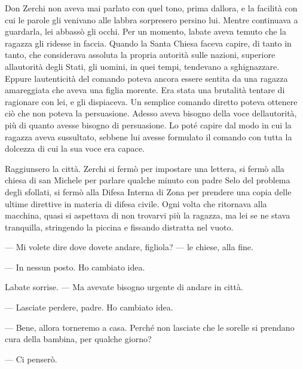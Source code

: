 Don Zerchi non aveva mai parlato con quel tono, prima
d\textquotesingle allora, e la facilità con cui le parole gli venivano
alle labbra sorpresero persino lui. Mentre continuava a guardarla, lei
abbassò gli occhi. Per un momento, l\textquotesingle abate aveva temuto
che la ragazza gli ridesse in faccia. Quando la Santa Chiesa faceva
capire, di tanto in tanto, che considerava assoluta la propria autorità
sulle nazioni, superiore all\textquotesingle autorità degli Stati, gli
uomini, in quei tempi, tendevano a sghignazzare. Eppure
l\textquotesingle autenticità del comando poteva ancora essere sentita
da una ragazza amareggiata che aveva una figlia morente. Era stata una
brutalità tentare di ragionare con lei, e gli dispiaceva. Un semplice
comando diretto poteva ottenere ciò che non poteva la persuasione.
Adesso aveva bisogno della voce dell\textquotesingle autorità, più di
quanto avesse bisogno di persuasione. Lo poté capire dal modo in cui la
ragazza aveva sussultato, sebbene lui avesse formulato il comando con
tutta la dolcezza di cui la sua voce era capace.

Raggiunsero la città. Zerchi si fermò per impostare una lettera, si
fermò alla chiesa di san Michele per parlare qualche minuto con padre
Selo del problema degli sfollati, si fermò alla Difesa Interna di Zona
per prendere una copia delle ultime direttive in materia di difesa
civile. Ogni volta che ritornava alla macchina, quasi si aspettava di
non trovarvi più la ragazza, ma lei se ne stava tranquilla, stringendo
la piccina e fissando distratta nel vuoto.

--- Mi volete dire dove dovete andare, figliola? --- le chiese, alla
fine.

--- In nessun posto. Ho cambiato idea.

L\textquotesingle abate sorrise. --- Ma avevate bisogno urgente di
andare in città.

--- Lasciate perdere, padre. Ho cambiato idea.

--- Bene, allora torneremo a casa. Perché non lasciate che le sorelle si
prendano cura della bambina, per qualche giorno?

--- Ci penserò.

